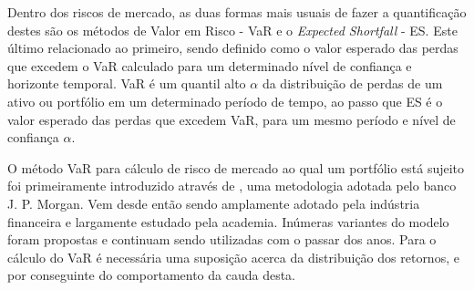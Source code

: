 \documentclass[1p]{elsarticle}
\theoremstyle{definition}
\begin{document}
Dentro dos riscos de mercado, as duas formas mais usuais de fazer a quantificação destes são os métodos de Valor em Risco - VaR e o \emph{Expected Shortfall} - ES. Este último relacionado ao primeiro, sendo definido como o valor esperado das perdas que excedem o VaR calculado para um determinado nível de confiança e horizonte temporal. VaR é um quantil alto $\alpha$ da distribuição de perdas de um ativo ou portfólio em um determinado período de tempo, ao passo que ES é o valor esperado das perdas que excedem VaR, para um mesmo período e nível de confiança $\alpha$.

O método VaR para cálculo de risco de mercado ao qual um portfólio está sujeito foi primeiramente introduzido através de \cite{RiskMetrics1995}, uma metodologia adotada pelo banco J. P. Morgan. Vem desde então sendo amplamente adotado pela indústria financeira e largamente estudado pela academia. Inúmeras variantes do modelo foram propostas e continuam sendo utilizadas com o passar dos anos. Para o cálculo do VaR é necessária uma suposição acerca da distribuição dos retornos, e por conseguinte do comportamento da cauda desta.


%
\end{document}
